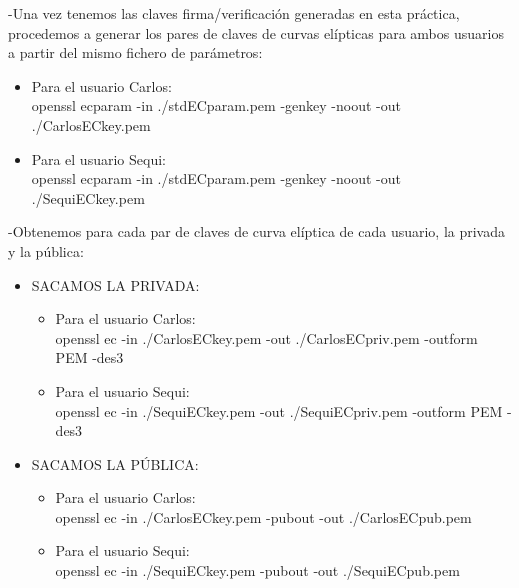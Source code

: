 -Una vez tenemos las claves firma/verificación generadas en esta práctica, procedemos a generar los pares de claves de curvas elípticas para
ambos usuarios a partir del mismo fichero de parámetros:

\begin{itemize}
	
	\item Para el usuario Carlos: \\
	
	openssl ecparam -in ./stdECparam.pem -genkey -noout -out ./CarlosECkey.pem 
	
	\item Para el usuario Sequi: \\
	
	openssl ecparam -in ./stdECparam.pem -genkey -noout -out ./SequiECkey.pem 
	
\end{itemize}

-Obtenemos para cada par de claves de curva elíptica de cada usuario, la privada y la pública:

\begin{itemize}
	\item SACAMOS LA PRIVADA:
	\begin{itemize}
		\item Para el usuario Carlos: \\
		
		openssl ec -in ./CarlosECkey.pem -out ./CarlosECpriv.pem -outform PEM -des3 
		
		\item Para el usuario Sequi: \\
		
		openssl ec -in ./SequiECkey.pem -out ./SequiECpriv.pem -outform PEM -des3 
	\end{itemize}
	\item SACAMOS LA PÚBLICA:
	\begin{itemize}
		\item Para el usuario Carlos: \\
		
		openssl ec -in ./CarlosECkey.pem -pubout -out ./CarlosECpub.pem
		
		\item Para el usuario Sequi: \\
		
		openssl ec -in ./SequiECkey.pem -pubout -out ./SequiECpub.pem
	\end{itemize}
\end{itemize}

